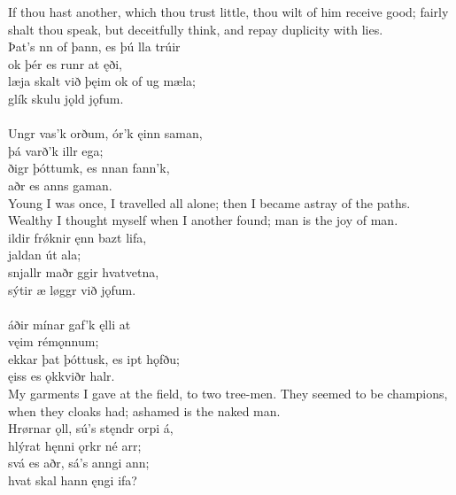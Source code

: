 \bvb If thou hast another, which thou trust little, thou wilt of him receive good; fairly shalt thou speak, but deceitfully think, and repay duplicity with lies. \\

\bva Þat's nn of þann, \hld es þú lla trúir \\%
\ind ok þér es runr at ęði, \\%
læja skalt við þęim \hld ok of ug mæla; \\%
\ind glík skulu jǫld jǫfum.\\%

 \\

\bva Ungr vas'k orðum, \hld {}ór'k ęinn saman, \\%
\ind þá varð'k illr ega; \\%
ðigr þóttumk, \hld es nnan fann'k, \\%
\ind {}aðr es anns gaman.\\%

\bvb Young I was once, I travelled all alone; then I became astray of the paths. Wealthy I thought myself when I another found; man is the joy of man. \\

\bva {}ildir frǿknir \hld {}ęnn bazt lifa, \\%
\ind {}jaldan út ala; \\%
snjallr maðr \hld {}ggir hvatvetna, \\%
\ind sýtir æ løggr við jǫfum.\\%

 \\

\bva {}áðir mínar \hld gaf'k ęlli at \\%
\ind {}vęim rémǫnnum; \\%
ekkar þat þóttusk, \hld es ipt hǫfðu; \\%
\ind {}ęiss es ǫkkviðr halr.\\%

\bvb My garments I gave at the field, to two tree-men. They seemed to be champions, when they cloaks had; ashamed is the naked man. \\

\bva Hrørnar ǫll, \hld sú's stęndr orpi á, \\%
\ind hlýrat hęnni ǫrkr né arr; \\%
svá es aðr, \hld sá's anngi ann; \\%
\ind hvat skal hann ęngi ifa?\\%


